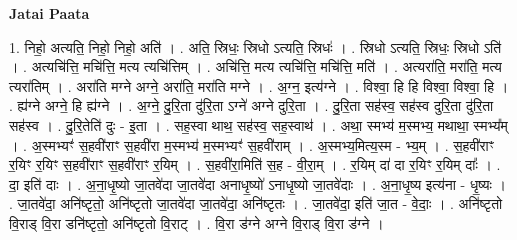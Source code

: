 \documentclass[17pt]{extarticle}
\begin{document}
\textbf{Jatai Paata} \newline

1. निहो॒ अत्यति॒ निहो॒ निहो॒ अति॑ । . अति॒ स्रिधः॒ स्रिधो ऽत्यति॒ स्रिधः॑ । . स्रिधो ऽत्यति॒ स्रिधः॒ स्रिधो ऽति॑ । . अत्यचि॑त्ति॒ मचि॑त्ति॒ मत्य त्यचि॑त्तिम् । . अचि॑त्ति॒ मत्य त्यचि॑त्ति॒ मचि॑त्ति॒ मति॑ । . अत्यरा॑ति॒ मरा॑ति॒ मत्य त्यरा॑तिम् । . अरा॑ति मग्ने अग्ने॒ अरा॑ति॒ मरा॑ति मग्ने । . अ॒ग्न॒ इत्य॑ग्ने । . विश्वा॒ हि हि विश्वा॒ विश्वा॒ हि । . ह्य॑ग्ने अग्ने॒ हि ह्य॑ग्ने । . अ॒ग्ने॒ दु॒रि॒ता दु॑रि॒ता ऽग्ने॑ अग्ने दुरि॒ता । . दु॒रि॒ता सह॑स्व॒ सह॑स्व दुरि॒ता दु॑रि॒ता सह॑स्व । . दु॒रि॒तेति॑ दुः - इ॒ता । . सह॒स्वा थाथ॒ सह॑स्व॒ सह॒स्वाथ॑ । . अथा॒ स्मभ्य॑ म॒स्मभ्य॒ मथाथा॒ स्मभ्य᳚म् । . अ॒स्मभ्यꣳ॑ स॒हवी॑राꣳ स॒हवी॑रा म॒स्मभ्य॑ म॒स्मभ्यꣳ॑ स॒हवी॑राम् । . अ॒स्मभ्य॒मित्य॒स्म - भ्य॒म् । . स॒हवी॑राꣳ र॒यिꣳ र॒यिꣳ स॒हवी॑राꣳ स॒हवी॑राꣳ र॒यिम् । . स॒हवी॑रा॒मिति॑ स॒ह - वी॒रा॒म् । . र॒यिम् दा॑ दा र॒यिꣳ र॒यिम् दाः᳚ । . दा॒ इति॑ दाः । . अ॒ना॒धृ॒ष्यो जा॒तवे॑दा जा॒तवे॑दा अनाधृ॒ष्यो॑ ऽनाधृ॒ष्यो जा॒तवे॑दाः । . अ॒ना॒धृ॒ष्य इत्य॑ना - धृ॒ष्यः । . जा॒तवे॑दा॒ अनि॑ष्टृतो॒ अनि॑ष्टृतो जा॒तवे॑दा जा॒तवे॑दा॒ अनि॑ष्टृतः । . जा॒तवे॑दा॒ इति॑ जा॒त - वे॒दाः॒ । . अनि॑ष्टृतो वि॒राड् वि॒रा डनि॑ष्टृतो॒ अनि॑ष्टृतो वि॒राट् । . वि॒रा ड॑ग्ने अग्ने वि॒राड् वि॒रा ड॑ग्ने । \newline
\end{document}
